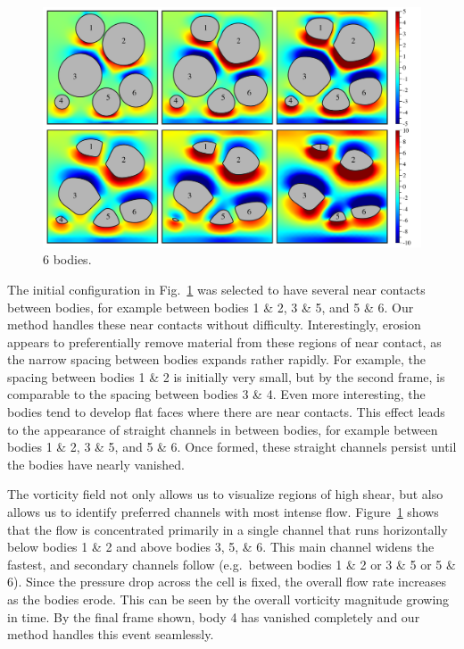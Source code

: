 \documentclass[preprint, 10pt]{elsarticle}
\begin{document}
\begin{figure}%
\begin{center}
\includegraphics[width = 0.9 \textwidth]{./figs/06bod.pdf}
\caption{\label{fig:06bodies} 6 bodies.
}
\end{center}
\end{figure}

The initial configuration in  Fig.~\ref{fig:06bodies} was selected to have several near contacts between bodies, for example between bodies 1 \& 2, 3 \& 5, and 5 \& 6. Our method handles these near contacts without difficulty. Interestingly, erosion appears to preferentially remove material from these regions of near contact, as the narrow spacing between bodies expands rather rapidly. For example, the spacing between bodies 1 \& 2 is initially very small, but by the second frame, is comparable to the spacing between bodies 3 \& 4. Even more interesting, the bodies tend to develop flat faces where there are near contacts. This effect leads to the appearance of straight channels in between bodies, for example between bodies 1 \& 2, 3 \& 5, and 5 \& 6. Once formed, these straight channels persist until the bodies have nearly vanished.

The vorticity field not only allows us to visualize regions of high shear, but also allows us to identify preferred channels with most intense flow. Figure~\ref{fig:06bodies} shows that the flow is concentrated primarily in a single channel that runs horizontally below bodies 1 \& 2 and above bodies 3, 5, \& 6. This main channel widens the fastest, and secondary channels follow (e.g.~between bodies 1 \& 2 or 3 \& 5 or 5 \& 6). Since the pressure drop across the cell is fixed, the overall flow rate increases as the bodies erode. This can be seen by the overall vorticity magnitude growing in time. By the final frame shown, body 4 has vanished completely and our method handles this event seamlessly.
\end{document}
